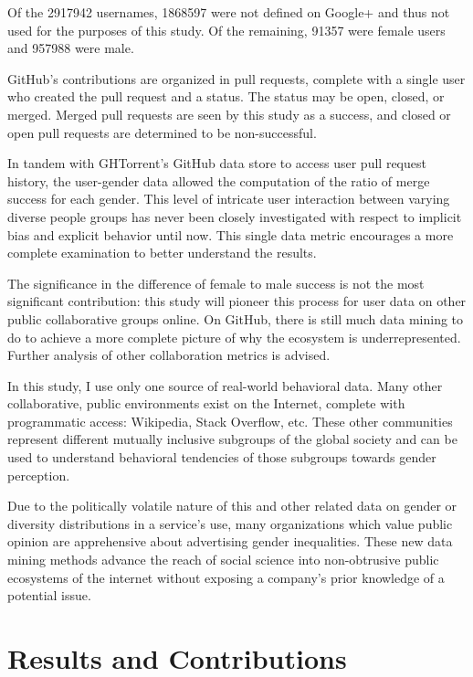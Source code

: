 \documentclass{sigplanconf}
\begin{document}
Of the \num{2917942} usernames, \num{1868597} were not defined on Google+ and thus
not used for the purposes of this study. Of the remaining, \num{91357} were
female users and \num{957988} were male.

GitHub's contributions are organized in pull requests, complete with a single
user who created the pull request and a status. The status may be open, closed,
or merged. Merged pull requests are seen by this study as a success, and closed
or open pull requests are determined to be non-successful.

In tandem with GHTorrent's GitHub data store to
access user pull request history, the user-gender data allowed the computation of
the ratio of merge success for each gender. This level of intricate user interaction
between varying diverse people groups has never been closely investigated with
respect to implicit bias and explicit behavior until
now. This single data metric encourages a more complete examination to better
understand the results.

The significance in the difference of female to male success is not the most
significant contribution: this study will pioneer this process for user data on
other public collaborative groups online.
On GitHub, there is still much data mining to do to achieve a more complete
picture of why the ecosystem is underrepresented. Further analysis of other
collaboration metrics is advised.

In this study, I use only one source of real-world behavioral data.
Many other collaborative, public environments exist on the Internet, complete
with programmatic access: Wikipedia, Stack Overflow, etc. These other
communities represent different mutually inclusive subgroups of the global
society and can be used to understand behavioral tendencies of those subgroups
towards gender perception.

Due to the politically volatile nature of this and other related data on gender
or diversity distributions in a service's use, many organizations which value
public opinion are apprehensive about advertising gender inequalities. These new data
mining methods advance the reach of social science into non-obtrusive public
ecosystems of the internet without exposing a company's prior knowledge of a
potential issue.

\section{Results and Contributions}
\end{document}
